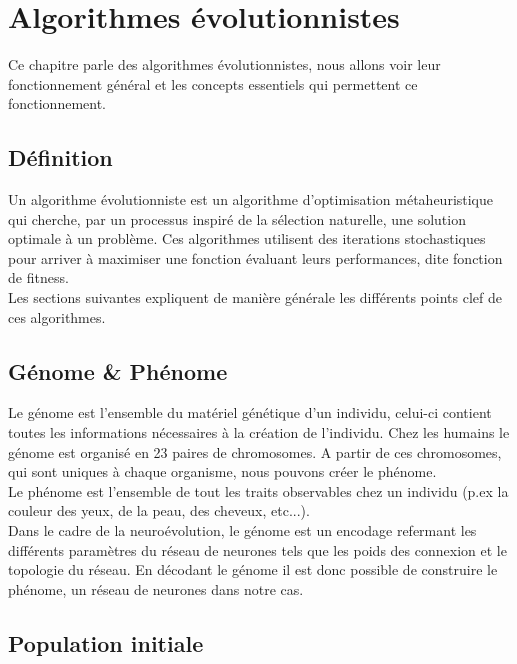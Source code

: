 \documentclass{article}
\begin{document}
\newpage
\section{Algorithmes évolutionnistes}

Ce chapitre parle des algorithmes évolutionnistes, nous allons voir leur fonctionnement général et les concepts essentiels qui permettent ce fonctionnement.

\subsection{Définition}

Un algorithme évolutionniste est un algorithme d'optimisation métaheuristique qui cherche, par un processus inspiré de la sélection naturelle, une solution optimale à un problème. Ces algorithmes utilisent des iterations stochastiques pour arriver à maximiser une fonction évaluant leurs performances, dite fonction de fitness\cite{wikiea}.\\

Les sections suivantes expliquent de manière générale les différents points clef de ces algorithmes.

\subsection{Génome \& Phénome}

Le génome est l'ensemble du matériel génétique d'un individu, celui-ci contient toutes les informations nécessaires à la création de l'individu\cite{wikigenome}. Chez les humains le génome est organisé en 23 paires de chromosomes. A partir de ces chromosomes, qui sont uniques à chaque organisme, nous pouvons créer le phénome.\\
Le phénome est l'ensemble de tout les traits observables chez un individu (p.ex la couleur des yeux, de la peau, des cheveux, etc...)\cite{wikiphenome}.\\

Dans le cadre de la neuroévolution, le génome est un encodage refermant les différents paramètres du réseau de neurones tels que les poids des connexion et le topologie du réseau. En décodant le génome il est donc possible de construire le phénome, un réseau de neurones dans notre cas.

\subsection{Population initiale}
\end{document}

